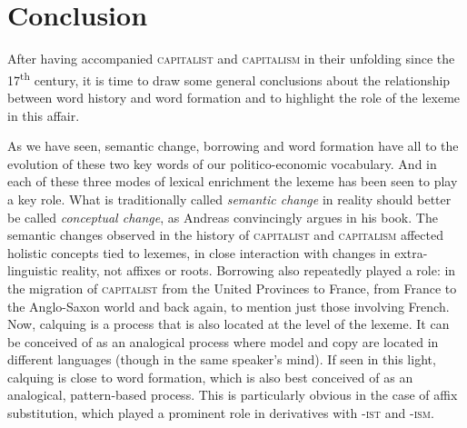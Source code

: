 \documentclass[output=paper]{langsci/langscibook}
\begin{document}
\section{Conclusion}

After having accompanied \textsc{capitalist} and \textsc{capitalism} in
their unfolding since the 17\textsuperscript{th} century, it is time to
draw some general conclusions about the relationship between word
history and word formation and to highlight the role of the lexeme in
this affair.

As we have seen, semantic change, borrowing and word formation have all
 to the evolution of these two key words of our
politico-economic vocabulary. And in each of these three modes of
lexical enrichment the lexeme has been seen to play a key role. What is
traditionally called \emph{semantic change} in reality should better be
called \emph{conceptual change}, as Andreas %
\citeauthor{Blank97} %
%
convincingly argues in
his %
\citeyear{Blank97} %
%
book. The semantic changes observed in the history of
\textsc{capitalist} and \textsc{capitalism} affected holistic concepts
tied to lexemes, in close interaction with changes in extra-linguistic
reality, not affixes or roots. Borrowing also repeatedly played a role:
in the migration of \textsc{capitalist} from the United Provinces to
France, from France to the Anglo-Saxon world and back again, to mention
just those involving French. Now, calquing is a process that is also
located at the level of the lexeme. It can be conceived of as an
analogical process where model and copy are located in different
languages (though in the same speaker's mind). If seen in this light,
calquing is close to word formation, which is also best conceived of as
an analogical, pattern-based process. This is particularly obvious in
the case of affix substitution, which played a prominent role in
derivatives with -\textsc{ist} and -\textsc{ism}.
\end{document}
